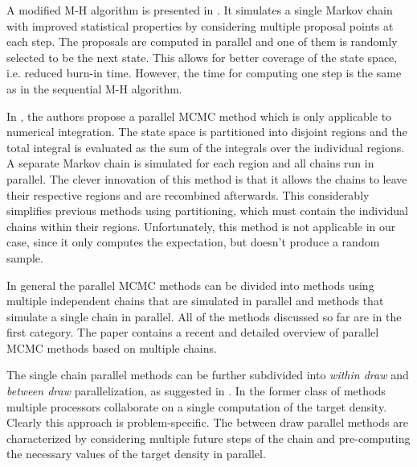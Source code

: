 \documentclass[11pt,letterpaper]{article}       %
\begin{document}
A modified M-H algorithm is presented in \cite{miller2010markov}.  It simulates
a single Markov chain with improved  statistical properties by considering
multiple proposal points at each step.  The proposals are computed in  parallel
and one of them is randomly selected to be the next state.  This allows for
better coverage of the state space, i.e. reduced burn-in time.  However, the
time for computing one step is the same as in the sequential 
M-H algorithm.


In \cite{vanderwerken2013parallel}, the authors propose a parallel MCMC method
which is only applicable to numerical integration.  The state space is
partitioned into disjoint regions and the total integral is evaluated as the
sum of the integrals over the individual regions. A separate Markov chain is
simulated for each region and all chains run in parallel.  The clever
innovation of this method is that it allows the chains to leave their
respective regions and are recombined afterwards.  This considerably simplifies
previous methods using partitioning, which must contain the individual chains
within their regions.  Unfortunately, this method is not applicable in our
case, since it only computes the expectation, but doesn't produce a random
sample.

In general the parallel MCMC methods can be divided into methods using multiple
independent chains that are simulated in parallel and methods that simulate a
single chain in parallel.  All of the methods discussed so far are in the first
category.  The paper \cite{guo2012parallel} contains a recent and detailed
overview of parallel MCMC methods based on multiple chains.

The single chain parallel methods can be further subdivided into \emph{within
draw} and \emph{between draw} parallelization, as suggested in
\cite{strid2010efficient}.  In the former class of methods multiple processors
collaborate on a single computation of the target density.  Clearly this
approach is problem-specific.  The between draw parallel methods are
characterized by considering multiple future steps of the chain and
pre-computing the necessary values of the target density in parallel. 
\end{document}
